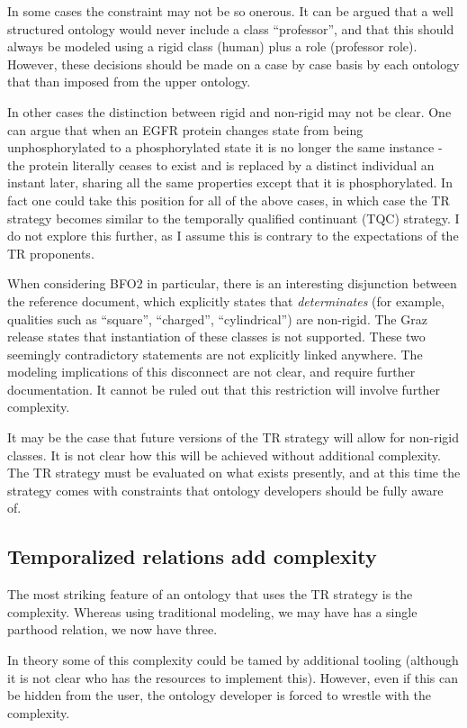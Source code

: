 \documentclass{bioinfo}
\begin{document}
In some cases the constraint may not be so onerous. It can be argued
that a well structured ontology would never include a class
``professor'', and that this should always be modeled using a rigid
class (human) plus a role (professor role). However, these decisions
should be made on a case by case basis by each ontology that than
imposed from the upper ontology.

In other cases the distinction between rigid and non-rigid may not be
clear. One can argue that when an EGFR protein changes state from
being unphosphorylated to a phosphorylated state it is no longer the
same instance - the protein literally ceases to exist and is replaced
by a distinct individual an instant later, sharing all the same
properties except that it is phosphorylated. In fact one could take
this position for all of the above cases, in which case the TR
strategy becomes similar to the temporally qualified continuant (TQC)
strategy. I do not explore this further, as I assume this is contrary
to the expectations of the TR proponents.

When considering BFO2 in particular, there is an interesting
disjunction between the reference document, which explicitly states
that \emph{determinates} (for example, qualities such as ``square'',
``charged'', ``cylindrical'') are non-rigid. The Graz release states
that instantiation of these classes is not supported. These two
seemingly contradictory statements are not explicitly linked
anywhere. The modeling implications of this disconnect are not clear,
and require further documentation. It cannot be ruled out that this
restriction will involve further complexity.

It may be the case that future versions of the TR strategy will allow
for non-rigid classes. It is not clear how this will be achieved
without additional complexity.  The TR strategy must be evaluated on
what exists presently, and at this time the strategy comes with
constraints that ontology developers should be fully aware of.

\subsection{Temporalized relations add complexity}

The most striking feature of an ontology that uses the TR strategy is
the complexity. Whereas using traditional modeling, we may have has a
single parthood relation, we now have three.

In theory some of this complexity could be tamed by additional tooling
(although it is not clear who has the resources to implement
this). However, even if this can be hidden from the user, the ontology
developer is forced to wrestle with the complexity.
\end{document}
